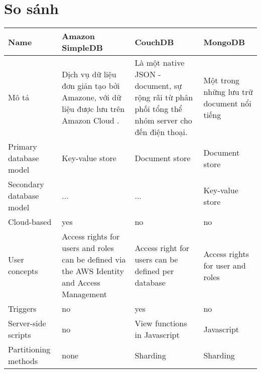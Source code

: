 \section{So sánh}
	\begin{tabu} to 1.2\textwidth { | X[l] | X[l] | X[l] | X[l] | }
 		\hline
 		Name &Amazon SimpleDB& CouchDB& MongoDB \\
 		\hline
 		Mô tả & Dịch vụ dữ liệu đơn giản tạo bởi Amazone, với dữ liệu được lưu trên Amazon Cloud . &  Là một native JSON - document, sự rộng rãi từ phân phối tổng thể nhóm server cho đến điện thoại.& Một trong những lưu trữ document nổi tiếng \\
		\hline
		Primary database model
		&
		Key-value store
		&
		Document store
		&
		Document store \\
		\hline 
		Secondary database model
		&
		...
		&
		...
		&
		Key-value store \\
		\hline
		Cloud-based
		&
		yes
		&
		no
		&
		no \\
		\hline
		User concepts
		&
		Access rights for users and roles can be defined via the AWS Identity and Access Management
		&
		Access right for users can be defined per database
		&
		Access rights for user and roles \\
		\hline
		Triggers
		&
		no
		&
		yes
		&
		no \\
		\hline 
		Server-side scripts
		&
		no
		&
		View functions in Javascript
		&
		Javascript \\
		\hline
		Partitioning methods
		&
		none
		&
		Sharding
		&
		Sharding \\
		\hline
	\end{tabu}
